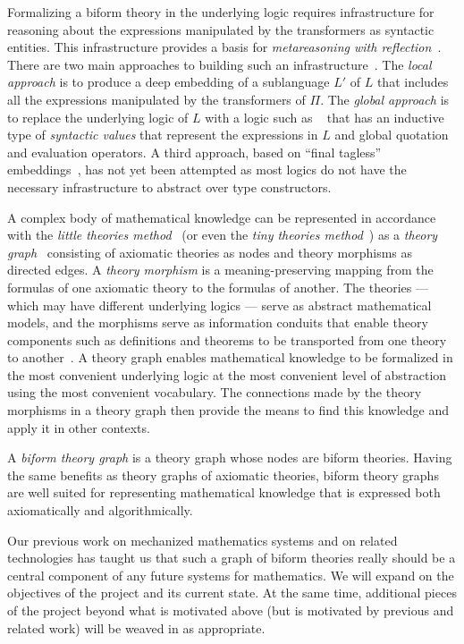 \documentclass[fleqn]{llncs}
\begin{document}
Formalizing a biform theory in the underlying logic requires
infrastructure for reasoning about the expressions manipulated by the
transformers as syntactic entities.  This infrastructure provides a
basis for \emph{metareasoning with reflection}~\cite{FarmerArxiv16}.
There are two main approaches to building such an
infrastructure~\cite{Farmer13}.  The \emph{local approach} is to
produce a deep embedding of a sublanguage $L'$ of $L$ that includes
all the expressions manipulated by the transformers of $\Pi$.  The
\emph{global approach} is to replace the underlying logic of $L$ with
a logic such as \churchqe~\cite{FarmerArxiv16} that has an inductive
type of \emph{syntactic values} that represent the expressions in $L$
and global quotation and evaluation operators.  A third approach,
based on ``final tagless'' embeddings~\cite{CaretteKS09}, has not yet
been attempted as most logics do not have the necessary infrastructure
to abstract over type constructors.

A complex body of mathematical knowledge can be represented in
accordance with the \emph{little theories method}~\cite{FarmerEtAl92b}
(or even the \emph{tiny theories method}~\cite{CaretteOConnorTPC})
as a \emph{theory graph}~\cite{Kohlhase14} consisting of axiomatic
theories as nodes and theory morphisms as directed edges.  A
\emph{theory morphism} is a meaning-preserving mapping from the
formulas of one axiomatic theory to the formulas of another.  The
theories --- which may have different underlying logics --- serve as
abstract mathematical models, and the morphisms serve as information
conduits that enable theory components such as definitions and
theorems to be transported from one theory to
another~\cite{BarwiseSeligman97}.  A theory graph enables mathematical
knowledge to be formalized in the most convenient underlying logic at
the most convenient level of abstraction using the most convenient
vocabulary.  The connections made by the theory morphisms in a theory
graph then provide the means to find this knowledge and apply it in
other contexts.

A \emph{biform theory graph} is a theory graph whose nodes are biform
theories. Having the same benefits as theory graphs of axiomatic
theories, biform theory graphs are well suited for representing
mathematical knowledge that is expressed both axiomatically and
algorithmically.
  
Our previous work on mechanized mathematics systems and on related
technologies has taught us that such a graph of biform theories 
really should be a central component of any future systems for
mathematics. We will expand on the objectives of the project and
its current state. At the same time, additional pieces of the project
beyond what is motivated above (but is motivated by previous and
related work) will be weaved in as appropriate.
\end{document}

